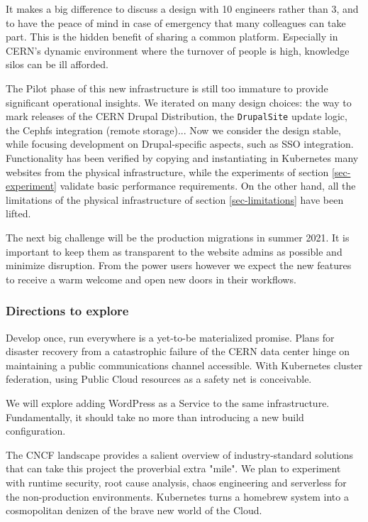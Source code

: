 It makes a big difference to discuss a design with 10 engineers rather than 3, and to have the peace of mind in case of emergency that many colleagues can take part.
This is the hidden benefit of sharing a common platform.
Especially in CERN's dynamic environment where the turnover of people is high, knowledge silos can be ill afforded.

The Pilot phase of this new infrastructure is still too immature to provide significant operational insights.
We iterated on many design choices: the way to mark releases of the CERN Drupal Distribution, the \texttt{DrupalSite} update logic, the Cephfs integration (remote storage)...
Now we consider the design stable, while focusing development on Drupal-specific aspects, such as SSO integration.
Functionality has been verified by copying and instantiating in Kubernetes many websites from the physical infrastructure,
while the experiments of section \ref{sec-experiment} validate basic performance requirements.
On the other hand, all the limitations of the physical infrastructure of section \ref{sec-limitations} have been lifted.

The next big challenge will be the production migrations in summer 2021.
It is important to keep them as transparent to the website admins as possible and minimize disruption.
From the power users however we expect the new features to receive a warm welcome and open new doors in their workflows.

\subsubsection*{Directions to explore}

Develop once, run everywhere is a yet-to-be materialized promise.
Plans for disaster recovery from a catastrophic failure of the CERN data center hinge on maintaining a public communications channel accessible.
With Kubernetes cluster federation, using Public Cloud resources as a safety net is conceivable.

We will explore adding WordPress as a Service to the same infrastructure.
Fundamentally, it should take no more than introducing a new build configuration.

The CNCF landscape \cite{cncfLandscape} provides a salient overview of industry-standard solutions that can take this project the proverbial extra "mile".
We plan to experiment with runtime security, root cause analysis, chaos engineering and serverless for the non-production environments.
Kubernetes turns a homebrew system into a cosmopolitan denizen of the brave new world of the Cloud.